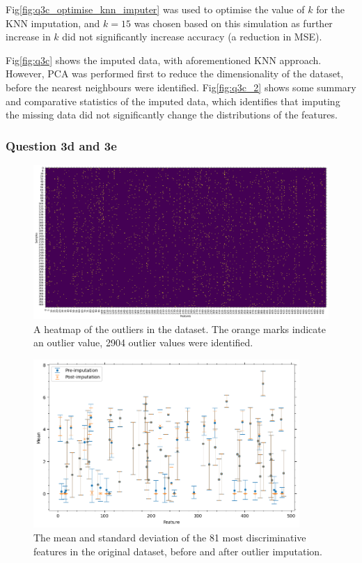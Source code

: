     Fig\eqref{fig:q3c_optimise_knn_imputer} was used to optimise the value of $k$ for the KNN imputation, and
    $k=15$ was chosen based on this simulation as further increase in $k$ did not significantly increase accuracy
    (a reduction in MSE).

    Fig\eqref{fig:q3c} shows the imputed data, with aforementioned KNN approach.
    However, PCA was performed first to reduce the dimensionality of the dataset, before the nearest neighbours were
    identified.
    Fig\eqref{fig:q3c_2} shows some summary and comparative statistics of the imputed data, which identifies that
    imputing the missing data did not significantly change the distributions of the features.

\subsubsection{Question 3d and 3e}\label{subsubsec:q3de}
    \begin{figure}[htb]
    \centering
    \includegraphics[width=1\textwidth]{./figures/q3d_heatmap}
    \caption{A heatmap of the outliers in the  dataset. The orange marks indicate an
        outlier value, 2904 outlier values were identified.}
    \label{fig:q3d_heatmap}
    \end{figure}

    \begin{figure}[htb]
    \centering
    \includegraphics[width=0.9\textwidth]{./figures/q3e}
    \caption{The mean and standard deviation of the 81 most discriminative features in the original
         dataset, before and after outlier imputation.}
    \label{fig:q3e}
    \end{figure}


